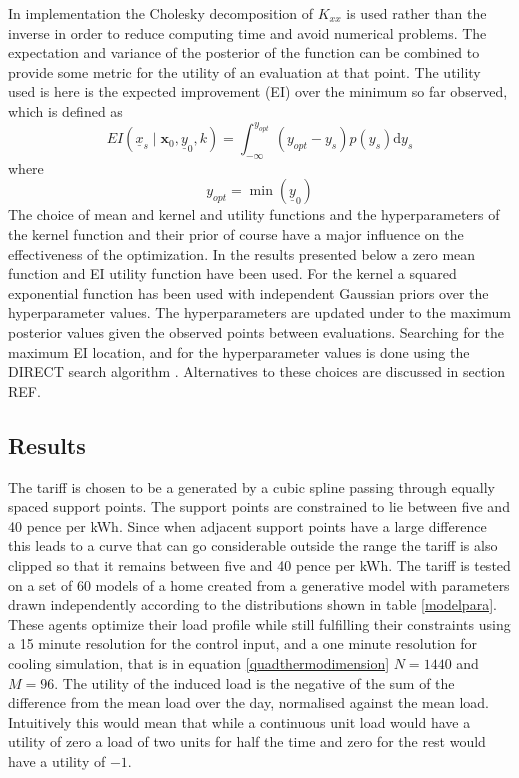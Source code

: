 \documentclass[a4paper, 10 pt, conference]{ieeeconf}  %
\begin{document}
In implementation the Cholesky decomposition of $K_{xx}$ is used rather than the inverse in order to reduce computing time and avoid numerical problems.
The expectation and variance of the posterior of the function can be combined to provide some metric for the utility of an evaluation at that point. The utility used is here is the expected improvement (EI) over the minimum so far observed, which is defined as
\begin{equation}
EI(\underline{x}_{s} \mid \mathbf{x}_0, \underline{y}_0, k)= \int_{-\infty  }^{y_{opt}} (y_{opt}-y_{s})p(y_{s}) \mathrm{d}y_{s}
\end{equation}
where
\begin{equation}
y_{opt} = \min(\underline{y}_{0})
\end{equation}
The choice of mean and kernel and utility functions and the hyperparameters of the kernel function and their prior of course have a major influence on the effectiveness of the optimization. In the results presented below a zero mean function and EI utility function have been used. For the kernel a squared exponential function has been used with independent Gaussian priors over the hyperparameter values. The hyperparameters are updated under to the maximum posterior values given the observed points between evaluations. Searching for the maximum EI location, and for the hyperparameter values is done using the DIRECT search algorithm \cite{jones1993lipschitzian}. Alternatives to these choices are discussed in section REF.
\subsection{Results}
The tariff is chosen to be a generated by a cubic spline passing through equally spaced support points. The support points are constrained to lie between five and 40 pence per kWh. Since when adjacent support points have a large difference this leads to a curve that can go considerable outside the range the tariff is also clipped so that it remains between five and 40 pence per kWh. The tariff is tested on a set of 60 models of a home created from a generative model with parameters drawn independently according to the distributions shown in table \ref{modelpara}. These agents optimize their load profile while still fulfilling their constraints using a 15 minute resolution for the control input, and a one minute resolution for cooling simulation, that is in equation \ref{quadthermodimension} $N=1440$ and $M=96$. The utility of the induced load is the negative of the sum of the difference from the mean load over the day, normalised against the mean load. Intuitively this would mean that while a continuous unit load would have a utility of zero a load of two units for half the time and zero for the rest would have a utility of $-1$.
\end{document}
